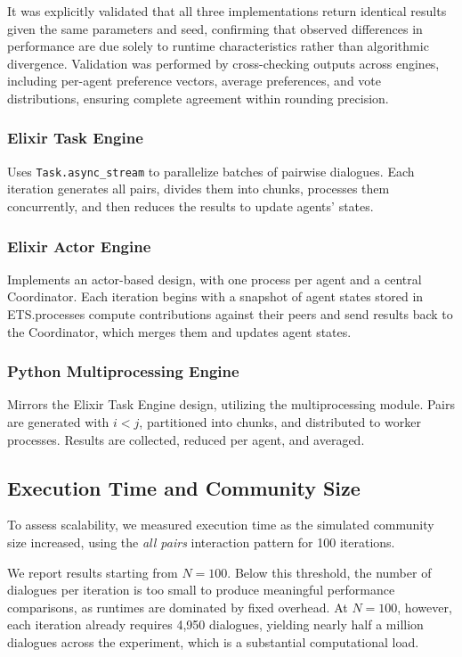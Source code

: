 \documentclass[
]{ceurart}
\begin{document}
It was explicitly validated that all three implementations return identical results given the same parameters and seed, confirming that observed differences in performance are due solely to runtime characteristics rather than algorithmic divergence. Validation was performed by cross-checking outputs across engines, including per-agent preference vectors, average preferences, and vote distributions, ensuring complete agreement within rounding precision.

\subsubsection{Elixir Task Engine}
Uses \verb|Task.async_stream| to parallelize batches of pairwise dialogues. Each iteration generates all pairs, divides them into chunks, processes them concurrently, and then reduces the results to update agents' states.

\subsubsection{Elixir Actor Engine}
Implements an actor-based design, with one process per agent and a central Coordinator. Each iteration begins with a snapshot of agent states stored in ETS.\@Agent processes compute contributions against their peers and send results back to the Coordinator, which merges them and updates agent states.

\subsubsection{Python Multiprocessing Engine}
Mirrors the Elixir Task Engine design, utilizing the multiprocessing module. Pairs are generated with $i < j$, partitioned into chunks, and distributed to worker processes. Results are collected, reduced per agent, and averaged.


\subsection{Execution Time and Community Size}
To assess scalability, we measured execution time as the simulated community size increased, using the \emph{all pairs} interaction pattern for 100 iterations.

We report results starting from $N=100$. Below this threshold, the number of dialogues per iteration is too small to produce meaningful performance comparisons, as runtimes are dominated by fixed overhead. At $N=100$, however, each iteration already requires 4,950 dialogues, yielding nearly half a million dialogues across the experiment, which is a substantial computational load.
\end{document}
